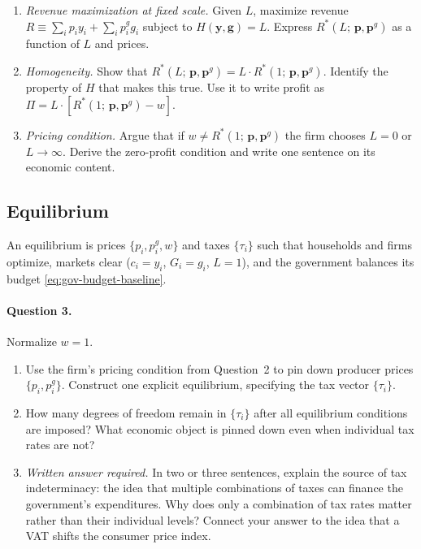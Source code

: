 \begin{enumerate}[label=(\alph*)]
    \item \emph{Revenue maximization at fixed scale.} Given $L$, maximize revenue $R \equiv \sum_i p_i y_i + \sum_i p_i^g g_i$ subject to $H(\mathbf{y}, \mathbf{g}) = L$. Express $R^*(L;\,\mathbf{p},\mathbf{p}^g)$ as a function of $L$ and prices.
 
    \item \emph{Homogeneity.} Show that $R^*(L;\,\mathbf{p},\mathbf{p}^g) = L \cdot R^*(1;\,\mathbf{p},\mathbf{p}^g)$. Identify the property of $H$ that makes this true. Use it to write profit as $\Pi = L\cdot[R^*(1;\,\mathbf{p},\mathbf{p}^g) - w]$.
 
    \item \emph{Pricing condition.} Argue that if $w \neq R^*(1;\,\mathbf{p},\mathbf{p}^g)$ the firm chooses $L = 0$ or $L \to \infty$. Derive the zero-profit condition and write one sentence on its economic content.
\end{enumerate}
 
\subsection{Equilibrium}
\label{subsec:eq-baseline}
 
An equilibrium is prices $\{p_i, p_i^g, w\}$ and taxes $\{\tau_i\}$ such that households and firms optimize, markets clear ($c_i = y_i$, $G_i = g_i$, $L = 1$), and the government balances its budget \eqref{eq:gov-budget-baseline}.
 
\paragraph{Question 3.}
Normalize $w = 1$.
 
\begin{enumerate}[label=(\alph*)]
    \item Use the firm's pricing condition from Question~2 to pin down producer prices $\{p_i, p_i^g\}$. Construct one explicit equilibrium, specifying the tax vector $\{\tau_i\}$.
 
    \item How many degrees of freedom remain in $\{\tau_i\}$ after all equilibrium conditions are imposed? What economic object is pinned down even when individual tax rates are not?
 
    \item \emph{Written answer required.} In two or three sentences, explain the source of tax indeterminacy: the idea that multiple combinations of taxes can finance the government's expenditures. Why does only a combination of tax rates matter rather than their individual levels? Connect your answer to the idea that a VAT shifts the consumer price index.
\end{enumerate}
 
